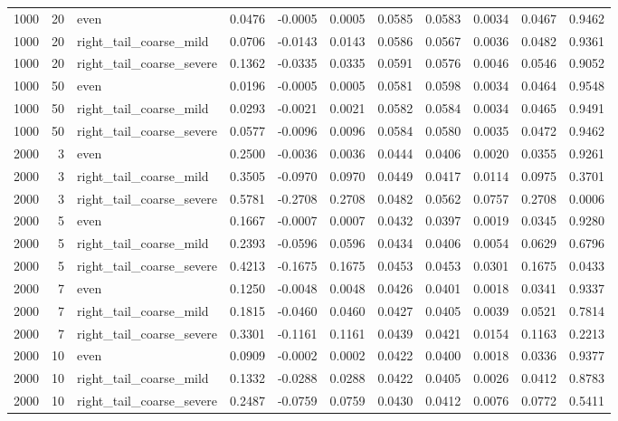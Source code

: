 \begin{table}[!h]
{\begin{tabular}[t]{rrlrrrrrrrr}
1000 & 20 & even & 0.0476 & -0.0005 & 0.0005 & 0.0585 & 0.0583 & 0.0034 & 0.0467 & 0.9462\\
1000 & 20 & right\_tail\_coarse\_mild & 0.0706 & -0.0143 & 0.0143 & 0.0586 & 0.0567 & 0.0036 & 0.0482 & 0.9361\\
1000 & 20 & right\_tail\_coarse\_severe & 0.1362 & -0.0335 & 0.0335 & 0.0591 & 0.0576 & 0.0046 & 0.0546 & 0.9052\\
1000 & 50 & even & 0.0196 & -0.0005 & 0.0005 & 0.0581 & 0.0598 & 0.0034 & 0.0464 & 0.9548\\
1000 & 50 & right\_tail\_coarse\_mild & 0.0293 & -0.0021 & 0.0021 & 0.0582 & 0.0584 & 0.0034 & 0.0465 & 0.9491\\
1000 & 50 & right\_tail\_coarse\_severe & 0.0577 & -0.0096 & 0.0096 & 0.0584 & 0.0580 & 0.0035 & 0.0472 & 0.9462\\
2000 & 3 & even & 0.2500 & -0.0036 & 0.0036 & 0.0444 & 0.0406 & 0.0020 & 0.0355 & 0.9261\\
2000 & 3 & right\_tail\_coarse\_mild & 0.3505 & -0.0970 & 0.0970 & 0.0449 & 0.0417 & 0.0114 & 0.0975 & 0.3701\\
2000 & 3 & right\_tail\_coarse\_severe & 0.5781 & -0.2708 & 0.2708 & 0.0482 & 0.0562 & 0.0757 & 0.2708 & 0.0006\\
2000 & 5 & even & 0.1667 & -0.0007 & 0.0007 & 0.0432 & 0.0397 & 0.0019 & 0.0345 & 0.9280\\
2000 & 5 & right\_tail\_coarse\_mild & 0.2393 & -0.0596 & 0.0596 & 0.0434 & 0.0406 & 0.0054 & 0.0629 & 0.6796\\
2000 & 5 & right\_tail\_coarse\_severe & 0.4213 & -0.1675 & 0.1675 & 0.0453 & 0.0453 & 0.0301 & 0.1675 & 0.0433\\
2000 & 7 & even & 0.1250 & -0.0048 & 0.0048 & 0.0426 & 0.0401 & 0.0018 & 0.0341 & 0.9337\\
2000 & 7 & right\_tail\_coarse\_mild & 0.1815 & -0.0460 & 0.0460 & 0.0427 & 0.0405 & 0.0039 & 0.0521 & 0.7814\\
2000 & 7 & right\_tail\_coarse\_severe & 0.3301 & -0.1161 & 0.1161 & 0.0439 & 0.0421 & 0.0154 & 0.1163 & 0.2213\\
2000 & 10 & even & 0.0909 & -0.0002 & 0.0002 & 0.0422 & 0.0400 & 0.0018 & 0.0336 & 0.9377\\
2000 & 10 & right\_tail\_coarse\_mild & 0.1332 & -0.0288 & 0.0288 & 0.0422 & 0.0405 & 0.0026 & 0.0412 & 0.8783\\
2000 & 10 & right\_tail\_coarse\_severe & 0.2487 & -0.0759 & 0.0759 & 0.0430 & 0.0412 & 0.0076 & 0.0772 & 0.5411\\

\end{tabular}}
\end{table}
